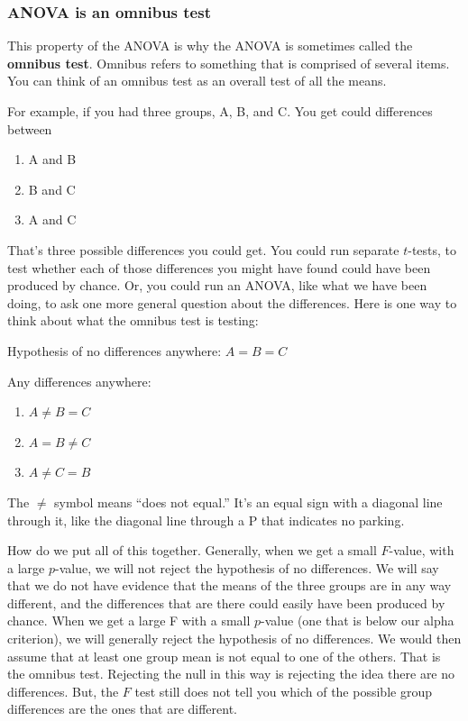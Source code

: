 \documentclass[
]{book}
\providecommand{\tightlist}{%
  \setlength{\itemsep}{0pt}\setlength{\parskip}{0pt}}
\begin{document}
\subsubsection{ANOVA is an omnibus test}\label{anova-is-an-omnibus-test}

This property of the ANOVA is why the ANOVA is sometimes called the \textbf{omnibus test}. Omnibus refers to something that is comprised of several items. You can think of an omnibus test as an overall test of all the means.

For example, if you had three groups, A, B, and C. You get could differences between

\begin{enumerate}
\def\labelenumi{\arabic{enumi}.}
\tightlist
\item
  A and B
\item
  B and C
\item
  A and C
\end{enumerate}

That's three possible differences you could get. You could run separate \(t\)-tests, to test whether each of those differences you might have found could have been produced by chance. Or, you could run an ANOVA, like what we have been doing, to ask one more general question about the differences. Here is one way to think about what the omnibus test is testing:

Hypothesis of no differences anywhere: \(A = B = C\)

Any differences anywhere:

\begin{enumerate}
\def\labelenumi{\alph{enumi}.}
\tightlist
\item
  \(A \neq B = C\)
\item
  \(A = B \neq C\)
\item
  \(A \neq C = B\)
\end{enumerate}

The \(\neq\) symbol means ``does not equal.'' It's an equal sign with a diagonal line through it, like the diagonal line through a P that indicates no parking.

How do we put all of this together. Generally, when we get a small \(F\)-value, with a large \(p\)-value, we will not reject the hypothesis of no differences. We will say that we do not have evidence that the means of the three groups are in any way different, and the differences that are there could easily have been produced by chance. When we get a large F with a small \(p\)-value (one that is below our alpha criterion), we will generally reject the hypothesis of no differences. We would then assume that at least one group mean is not equal to one of the others. That is the omnibus test. Rejecting the null in this way is rejecting the idea there are no differences. But, the \(F\) test still does not tell you which of the possible group differences are the ones that are different.
\end{document}
